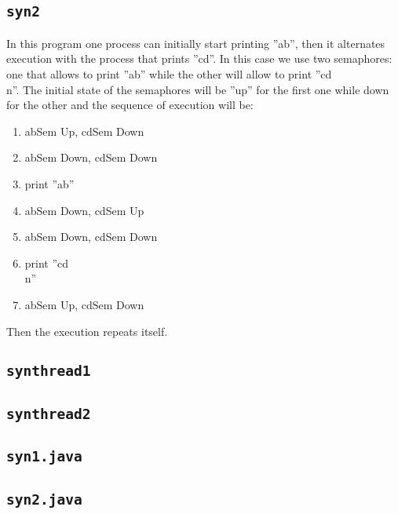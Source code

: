 \subsection{\texttt{syn2}}
In this program one process can initially start printing ''ab'', then it alternates execution with the process that prints ''cd''. In this case we use two semaphores: one that allows to print ''ab'' while the other will allow to print ''cd\\n''. The initial state of the semaphores will be ''up'' for the first one while down for the other and the sequence of execution will be:
\begin{enumerate}
\item abSem Up, cdSem Down
\item abSem Down, cdSem Down
\item print ''ab''
\item abSem Down, cdSem Up
\item abSem Down, cdSem Down
\item print ''cd\\n''
\item abSem Up, cdSem Down
\end{enumerate}
Then the execution repeats itself.

\subsection{\texttt{synthread1}}
\subsection{\texttt{synthread2}}
\subsection{\texttt{syn1.java}}

\subsection{\texttt{syn2.java}}


\clearpage




